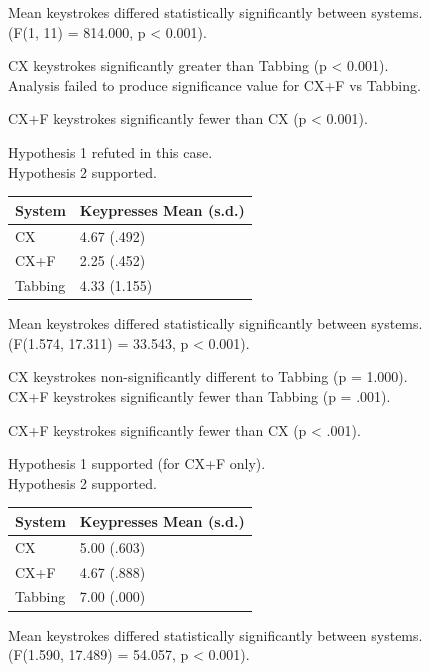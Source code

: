 \documentclass[a4paper, 12pt]{report}
\begin{document}
Mean keystrokes differed statistically significantly between systems.\\
(F(1, 11) = 814.000, p < 0.001).

CX keystrokes significantly greater than Tabbing (p < 0.001).\\
Analysis failed to produce significance value for CX+F vs Tabbing.

CX+F keystrokes significantly fewer than CX (p < 0.001).

Hypothesis 1 refuted in this case.\\
Hypothesis 2 supported.

\begin{tabular}{l l}
\hline\hline %
System & Keypresses Mean (s.d.) \\ [0.5ex] %
\hline %
CX & 4.67 (.492)\\
CX+F & 2.25 (.452)\\
Tabbing & 4.33 (1.155)\\ [1ex] %
\hline %
\end{tabular}

Mean keystrokes differed statistically significantly between systems.\\
(F(1.574, 17.311) = 33.543, p < 0.001).

CX keystrokes non-significantly different to Tabbing (p = 1.000).\\
CX+F keystrokes significantly fewer than Tabbing (p = .001).

CX+F keystrokes significantly fewer than CX (p < .001).

Hypothesis 1 supported (for CX+F only).\\
Hypothesis 2 supported.

\begin{tabular}{l l}
\hline\hline %
System & Keypresses Mean (s.d.) \\ [0.5ex] %
\hline %
CX & 5.00 (.603)\\
CX+F & 4.67 (.888)\\
Tabbing & 7.00 (.000)\\ [1ex] %
\hline %
\end{tabular}

Mean keystrokes differed statistically significantly between systems.\\
(F(1.590, 17.489) = 54.057, p < 0.001).
\end{document}

